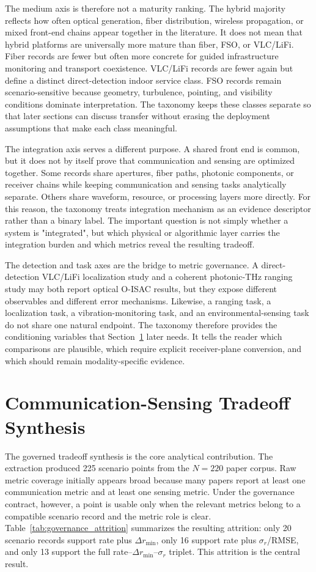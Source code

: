 \documentclass[letterpaper,journal]{IEEEtran}
\begin{document}
The medium axis is therefore not a maturity ranking. The hybrid majority reflects how often optical generation, fiber distribution, wireless propagation, or mixed front-end chains appear together in the literature. It does not mean that hybrid platforms are universally more mature than fiber, FSO, or VLC/LiFi. Fiber records are fewer but often more concrete for guided infrastructure monitoring and transport coexistence. VLC/LiFi records are fewer again but define a distinct direct-detection indoor service class. FSO records remain scenario-sensitive because geometry, turbulence, pointing, and visibility conditions dominate interpretation. The taxonomy keeps these classes separate so that later sections can discuss transfer without erasing the deployment assumptions that make each class meaningful.

The integration axis serves a different purpose. A shared front end is common, but it does not by itself prove that communication and sensing are optimized together. Some records share apertures, fiber paths, photonic components, or receiver chains while keeping communication and sensing tasks analytically separate. Others share waveform, resource, or processing layers more directly. For this reason, the taxonomy treats integration mechanism as an evidence descriptor rather than a binary label. The important question is not simply whether a system is "integrated", but which physical or algorithmic layer carries the integration burden and which metrics reveal the resulting tradeoff.

The detection and task axes are the bridge to metric governance. A direct-detection VLC/LiFi localization study and a coherent photonic-THz ranging study may both report optical O-ISAC results, but they expose different observables and different error mechanisms. Likewise, a ranging task, a localization task, a vibration-monitoring task, and an environmental-sensing task do not share one natural endpoint. The taxonomy therefore provides the conditioning variables that Section~\ref{sec:tradeoff} later needs. It tells the reader which comparisons are plausible, which require explicit receiver-plane conversion, and which should remain modality-specific evidence.

\section{Communication-Sensing Tradeoff Synthesis}
\label{sec:tradeoff}

The governed tradeoff synthesis is the core analytical contribution. The extraction produced 225 scenario points from the \(N=220\) paper corpus. Raw metric coverage initially appears broad because many papers report at least one communication metric and at least one sensing metric. Under the governance contract, however, a point is usable only when the relevant metrics belong to a compatible scenario record and the metric role is clear. Table~\ref{tab:governance_attrition} summarizes the resulting attrition: only 20 scenario records support rate plus \(\Delta r_{\min}\), only 16 support rate plus \(\sigma_r\)/RMSE, and only 13 support the full rate--\(\Delta r_{\min}\)--\(\sigma_r\) triplet. This attrition is the central result.
\end{document}

